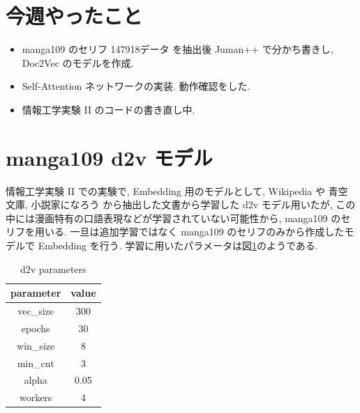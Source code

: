 \documentclass[twocolumn]{jarticle}     %
\begin{document}

\section{今週やったこと}
\begin{itemize}
  \item manga109 のセリフ 147918データ を抽出後 Juman++ で分かち書きし, Doc2Vec のモデルを作成.
  \item Self-Attention ネットワークの実装. 動作確認をした.
  \item 情報工学実験 II のコードの書き直し中.
\end{itemize}

\section{manga109 d2v モデル}
情報工学実験 II での実験で, Embedding 用のモデルとして, Wikipedia や 青空文庫, 小説家になろう から抽出した文書から学習した d2v モデル用いたが, この中には漫画特有の口語表現などが学習されていない可能性から, manga109 のセリフを用いる. 一旦は追加学習ではなく manga109 のセリフのみから作成したモデルで Embedding を行う. 学習に用いたパラメータは図\ref{tab:d2v}のようである.

\begin{table}[htb]
\begin{center}
\caption{d2v parameters}
\begin{tabular}{|c|c|}
\hline
parameter & value \\ \hline
vec\_size & 300   \\
epochs    & 30    \\
win\_size & 8     \\
min\_cnt  & 3     \\
alpha     & 0.05  \\
workers   & 4     \\ \hline
\end{tabular}
\label{tab:d2v}
\end{center}
\end{table}
\end{document}
